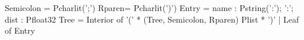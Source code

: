  Semicolon = Pcharlit(';')
 Rparen= Pcharlit(')')
\mbox{}
 Entry = {
  name : Pstring(':');
  ':';
  dist : Pfloat32
}
\mbox{}
 Tree =
     Interior of '(' * (Tree, Semicolon, Rparen) Plist * ')'
   | Leaf of Entry
